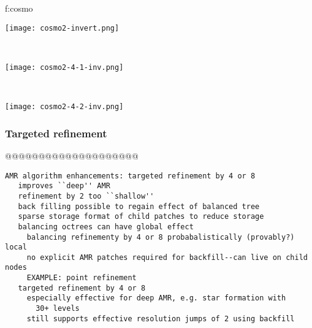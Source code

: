 \documentclass{article}
\begin{document}


{f:cosmo}{
\begin{minipage}{7.0in}
\begin{minipage}{2.2in}
\texttt{[image: cosmo2-invert.png]}
\end{minipage} \ 
\begin{minipage}{2.2in}
\texttt{[image: cosmo2-4-1-inv.png]}
\end{minipage} \ 
\begin{minipage}{2.2in}
\texttt{[image: cosmo2-4-2-inv.png]}
\end{minipage}
\end{minipage}
}

\subsubsection{Targeted refinement} \label{sss:targeted-refinement}

@@@@@@@@@@@@@@@@@@@@

\begin{verbatim}
AMR algorithm enhancements: targeted refinement by 4 or 8
   improves ``deep'' AMR
   refinement by 2 too ``shallow''
   back filling possible to regain effect of balanced tree
   sparse storage format of child patches to reduce storage 
   balancing octrees can have global effect
     balancing refinementy by 4 or 8 probabalistically (provably?) local
     no explicit AMR patches required for backfill--can live on child nodes 
     EXAMPLE: point refinement
   targeted refinement by 4 or 8
     especially effective for deep AMR, e.g. star formation with
       30+ levels
     still supports effective resolution jumps of 2 using backfill
\end{verbatim}
\end{document}
